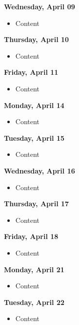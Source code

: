 \documentclass{article}
\begin{document}
\textbf{Wednesday, April 09}

\begin{itemize}
\item Content
\end{itemize}

\textbf{Thursday, April 10}

\begin{itemize}
\item Content
\end{itemize}

\textbf{Friday, April 11}

\begin{itemize}
\item Content
\end{itemize}

\textbf{Monday, April 14}

\begin{itemize}
\item Content
\end{itemize}

\textbf{Tuesday, April 15}

\begin{itemize}
\item Content
\end{itemize}

\textbf{Wednesday, April 16}

\begin{itemize}
\item Content
\end{itemize}

\textbf{Thursday, April 17}

\begin{itemize}
\item Content
\end{itemize}

\textbf{Friday, April 18}

\begin{itemize}
\item Content
\end{itemize}

\textbf{Monday, April 21}

\begin{itemize}
\item Content
\end{itemize}

\textbf{Tuesday, April 22}

\begin{itemize}
\item Content
\end{itemize}
\end{document}
